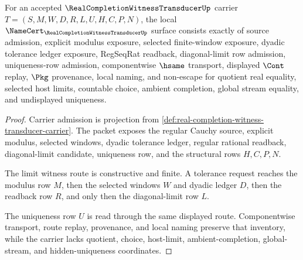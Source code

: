 \begin{theorem}
\label{thm:real-completion-witness-transducer-namecert-obligations}
For an accepted $\RealCompletionWitnessTransducerUp$ carrier $T=(S,M,W,D,R,L,U,H,C,P,N)$, the local $\NameCert_{\RealCompletionWitnessTransducerUp}$ surface consists exactly of source admission, explicit modulus exposure, selected finite-window exposure, dyadic tolerance ledger exposure, RegSeqRat readback, diagonal-limit row admission, uniqueness-row admission, componentwise $\hsame$ transport, displayed $\Cont$ replay, $\Pkg$ provenance, local naming, and non-escape for quotient real equality, selected host limits, countable choice, ambient completion, global stream equality, and undisplayed uniqueness.
\end{theorem}
\begin{proof}
Carrier admission is projection from \autoref{def:real-completion-witness-transducer-carrier}. The packet exposes the regular Cauchy source, explicit modulus, selected windows, dyadic tolerance ledger, regular rational readback, diagonal-limit candidate, uniqueness row, and the structural rows $H,C,P,N$.

The limit witness route is constructive and finite. A tolerance request reaches the modulus row $M$, then the selected windows $W$ and dyadic ledger $D$, then the readback row $R$, and only then the diagonal-limit row $L$.

The uniqueness row $U$ is read through the same displayed route. Componentwise transport, route replay, provenance, and local naming preserve that inventory, while the carrier lacks quotient, choice, host-limit, ambient-completion, global-stream, and hidden-uniqueness coordinates.
\end{proof}

